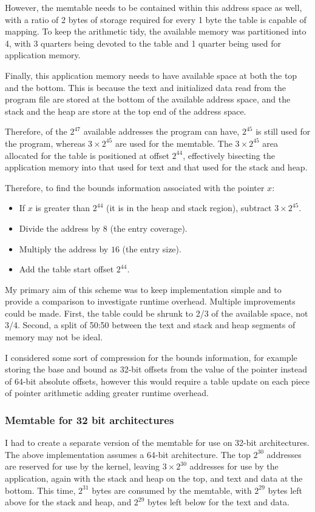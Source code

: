 However, the memtable needs to be contained within this address space as well, with a ratio of 2 bytes of storage required for every 1 byte the table is capable of mapping.
To keep the arithmetic tidy, the available memory was partitioned into 4, with 3 quarters being devoted to the table and 1 quarter being used for application memory.

Finally, this application memory needs to have available space at both the top and the bottom.
This is because the text and initialized data read from the program file are stored at the bottom of the available address space, and the stack and the heap are store at the top end of the address space.

Therefore, of the $2^{47}$ available addresses the program can have, $2^{45}$ is still used for the program, whereas $3\times 2^{45}$ are used for the memtable.
The $3\times 2^{45}$ area allocated for the table is positioned at offset $2^{44}$, effectively bisecting the application memory into that used for text and that used for the stack and heap.

Therefore, to find the bounds information associated with the pointer $x$:

\begin{itemize}
\item If $x$ is greater than $2^{44}$ (it is in the heap and stack region), subtract $3\times 2^{45}$.
\item Divide the address by $8$ (the entry coverage).
\item Multiply the address by $16$ (the entry size).
\item Add the table start offset $2^{44}$.
\end{itemize}

My primary aim of this scheme was to keep implementation simple and to provide a comparison to investigate runtime overhead.
Multiple improvements could be made.
First, the table could be shrunk to 2/3 of the available space, not 3/4.
Second, a split of 50:50 between the text and stack and heap segments of memory may not be ideal.

I considered some sort of compression for the bounds information, for example storing the base and bound as 32-bit offsets from the value of the pointer instead of 64-bit absolute offsets, however this would require a table update on each piece of pointer arithmetic adding greater runtime overhead.

\subsubsection{Memtable for 32 bit architectures}
I had to create a separate version of the memtable for use on 32-bit architectures.
The above implementation assumes a 64-bit architecture.
The top $2^{30}$ addresses are reserved for use by the kernel, leaving $3 \times 2^{30}$ addresses for use by the application, again with the stack and heap on the top, and text and data at the bottom.
This time, $2^{31}$ bytes are consumed by the memtable, with $2^{29}$ bytes left above for the stack and heap, and $2^{29}$ bytes left below for the text and data.
